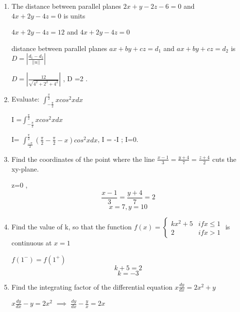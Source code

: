 \begin{enumerate}[label=\thesubsection.\arabic*, ref=\thesubsection.\theenumi]
Comparing all the values, the maximum value of $P$ is $23$, which occurs at the point $(5,4)$



The maximum profit occurs at the point $(5,4)$

\item 

The distance between parallel planes $2x+y-2z-6=0$ and $4x+2y-4z=0$ is units

\solution

$4x+2y-4z= 12$ and $4x+2y-4z=0$ 

distance between parallel planes $ax +by +cz= d_1 $ and $ax+by +cz=d_2$ is $D=\left\vert{}\frac{d_1-d_2}{\vert|u|\vert{}}\right\vert{}$

$D=\left\vert{}\frac{12}{\sqrt{4^2 + 2^2+ 4^2}}\right \vert{}$ , D =2 .

\item 

Evaluate: $\int_{-\frac{\pi}{2}}^{\frac{\pi}{2}}xcos^{2}xdx$

\solution

I =$\int_{-\frac{\pi}{2}}^{\frac{\pi}{2}}xcos^{2}xdx$

I= $\int _{\frac{-\pi}{2}}^{\frac{\pi}{2}}\left(\frac{\pi}{2}-\frac{\pi}{2}-x\right)cos^2 xdx$, I = -I ; I=0.

\item

Find the coordinates of the point where the line $\frac{x-1}{3}=\frac{y+4}{7}=\frac{z+4}{2}$ cuts the xy-plane.   

\solution

z=0 , $$\frac{x-1}{3}= \frac{y+4}{7}=2$$ $$x=7 ,y=10$$

\item 

Find the value of k, so that the function $f(x)= \begin{cases}
    kx^2+5 &ifx\le 1\\ 2 & ifx>1\end{cases} $ is continuous at $x=1$

\solution

$f(1^-)= f(1^+)$ $$k+5 = 2$$ $$k=-3$$

\item 

Find the integrating factor of the differential equation $x\frac{dy}{dx}=2x^{2}+y$

\solution

$x\frac{dy}{dx}-y= 2x^2$ $\implies$ $\frac{dy}{dx}-\frac{y}{x} = 2x $


\end{enumerate}
